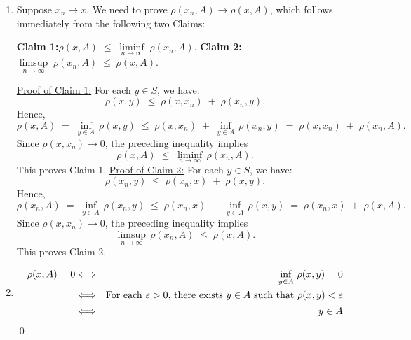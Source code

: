 \begin{enumerate}
\item
	Suppose $x_{n} \longrightarrow x$. We need to prove $\rho(x_{n},A) \longrightarrow \rho(x,A)$,
	which follows immediately from the following two Claims:
	\vskip 0.8cm
	\begin{center}
	\begin{minipage}{6.5in}
	\noindent
	\textbf{Claim 1:}\quad$\rho(x,A) \;\leq\; \underset{n\rightarrow\infty}{\liminf}\;\rho(x_{n},A)$.
	\vskip 0.2cm
	\textbf{Claim 2:}\quad$\underset{n\rightarrow\infty}{\limsup}\;\rho(x_{n},A) \;\leq\; \rho(x,A)$.
	\end{minipage}
	\end{center}
	\vskip 0.3cm
	\noindent
	\underline{Proof of Claim 1:}\quad
	For each $y \in S$, we have:
	\begin{equation*}
	\rho(x,y) \;\leq\; \rho(x,x_{n}) \;+\; \rho(x_{n},y).
	\end{equation*}
	Hence,
	\begin{equation*}
	\rho(x,A) \;=\; \inf_{y \in A}\,\rho(x,y) \;\leq\; \rho(x,x_{n}) \;+\; \inf_{y \in A}\,\rho(x_{n},y) \;=\; \rho(x,x_{n}) \;+\; \rho(x_{n},A).
	\end{equation*}
	Since $\rho(x,x_{n}) \longrightarrow 0$, the preceding inequality implies
	\begin{equation*}
	\rho(x,A) \;\leq\; \liminf_{n\rightarrow\infty}\,\rho(x_{n},A).
	\end{equation*}
	This proves Claim 1.
	\vskip 0.5cm
	\noindent
	\underline{Proof of Claim 2:}\quad
	For each $y \in S$, we have:
	\begin{equation*}
	\rho(x_{n},y) \;\leq\; \rho(x_{n},x) \;+\; \rho(x,y).
	\end{equation*}
	Hence,
	\begin{equation*}
	\rho(x_{n},A) \;=\; \inf_{y \in A}\,\rho(x_{n},y) \;\leq\; \rho(x_{n},x) \;+\; \inf_{y \in A}\,\rho(x,y) \;=\; \rho(x_{n},x) \;+\; \rho(x,A).
	\end{equation*}
	Since $\rho(x,x_{n}) \longrightarrow 0$, the preceding inequality implies
	\begin{equation*}
	\limsup_{n\rightarrow\infty}\,\rho(x_{n},A) \;\leq\; \rho(x,A).
	\end{equation*}
	This proves Claim 2.

\item
	\begin{eqnarray*}
	\rho(x,A) = 0
	&\Longleftrightarrow& \inf_{y\in A}\,\rho(x,y) = 0
	\\
	&\Longleftrightarrow& \textnormal{For each $\varepsilon > 0$, there exists $y \in A$ such that $\rho(x,y) < \varepsilon$}
	\\
	&\Longleftrightarrow& y \in \overline{A}
	\end{eqnarray*}
\qed
\end{enumerate}

